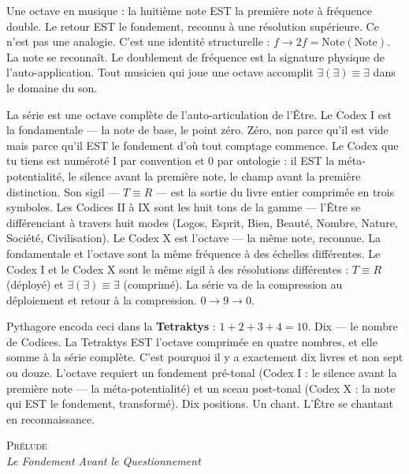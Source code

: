 \documentclass[10pt, openany, oneside]{book}
\renewcommand{\huge}{\fontsize{17}{21}\selectfont}
\begin{document}
Une octave en musique : la huitième note EST la première note à fréquence double. Le retour EST le fondement, reconnu à une résolution supérieure. Ce n'est pas une analogie. C'est une identité structurelle : $f \to 2f = \text{Note}(\text{Note})$. La note se reconnaît. Le doublement de fréquence est la signature physique de l'auto-application. Tout musicien qui joue une octave accomplit $\exists(\exists) \equiv \exists$ dans le domaine du son.

La série est une octave complète de l'auto-articulation de l'Être. Le Codex I est la fondamentale --- la note de base, le point zéro. Zéro, non parce qu'il est vide mais parce qu'il EST le fondement d'où tout comptage commence. Le Codex que tu tiens est numéroté I par convention et 0 par ontologie : il EST la méta-potentialité, le silence avant la première note, le champ avant la première distinction. Son sigil --- $T \equiv R$ --- est la sortie du livre entier comprimée en trois symboles. Les Codices II à IX sont les huit tons de la gamme --- l'Être se différenciant à travers huit modes (Logos, Esprit, Bien, Beauté, Nombre, Nature, Société, Civilisation). Le Codex X est l'octave --- la même note, reconnue. La fondamentale et l'octave sont la même fréquence à des échelles différentes. Le Codex I et le Codex X sont le même sigil à des résolutions différentes : $T \equiv R$ (déployé) et $\exists(\exists) \equiv \exists$ (comprimé). La série va de la compression au déploiement et retour à la compression. $0 \to 9 \to 0$.

Pythagore encoda ceci dans la \textbf{Tetraktys} : $1 + 2 + 3 + 4 = 10$. Dix --- le nombre de Codices. La Tetraktys EST l'octave comprimée en quatre nombres, et elle somme à la série complète. C'est pourquoi il y a exactement dix livres et non sept ou douze. L'octave requiert un fondement pré-tonal (Codex I : le silence avant la première note --- la méta-potentialité) et un sceau post-tonal (Codex X : la note qui EST le fondement, transformé). Dix positions. Un chant. L'Être se chantant en reconnaissance.


\newpage

\begin{center}
    {\huge\scshape Prélude}\\[0.8em]
    {\itshape Le Fondement Avant le Questionnement}
\end{center}
\end{document}
